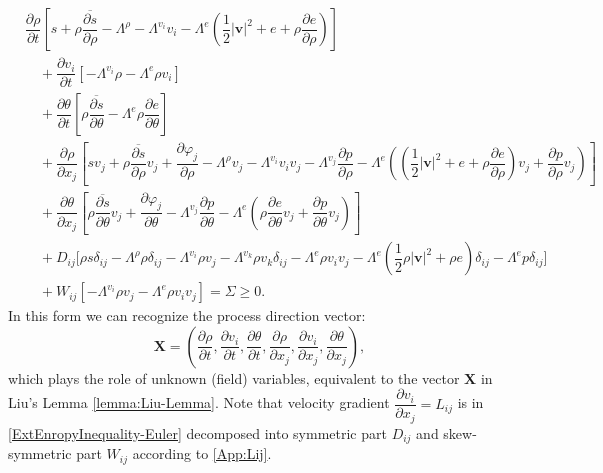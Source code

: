 \documentclass[a4paper,fleqn]{cas-sc}
\theoremstyle{definition}
\begin{document}
\begin{align} \label{ExtEnropyInequality-Euler}
	& \dfrac{\partial \rho}{\partial t} \left[ s + \rho \overline{\dfrac{\partial s}{\partial\rho}} - \Lambda^\rho - \Lambda^{v_i}v_i - \Lambda^ e \left(\dfrac{1}{2}|\mathbf{v}|^2 + e + \rho\dfrac{\partial e}{\partial\rho}\right) \right] 
	\nonumber \\
	& \quad + \dfrac{\partial v_i}{\partial t} \left[- \Lambda^{v_i}\rho - \Lambda^ e \rho v_i \right]
	\nonumber \\ 
	& \quad + \dfrac{\partial \theta}{\partial t} \left[ \rho \overline{\dfrac{\partial s}{\partial\theta}} - \Lambda^e \rho \dfrac{\partial e}{\partial\theta} \right] 
	\nonumber \\ 
	& \quad + \dfrac{\partial \rho}{\partial x_j} \left[ sv_j + \rho \overline{\dfrac{\partial s}{\partial\rho}} v_j + \dfrac{\partial\varphi_j}{\partial\rho} - \Lambda^\rho v_j - \Lambda^{v_i}v_i v_j - \Lambda^{v_j} \dfrac{\partial p}{\partial\rho} %
	- \Lambda^e \left(\left(\dfrac{1}{2}|\mathbf{v}|^2 + e + \rho\dfrac{\partial e}{\partial\rho} \right) v_j + \dfrac{\partial p}{\partial\rho} v_j \right) \right]
	\\ 
	& \quad + \dfrac{\partial \theta}{\partial x_j} \left[ \rho \overline{\dfrac{\partial s}{\partial\theta}} v_j + \dfrac{\partial\varphi_j}{\partial\theta} - \Lambda^{v_j}\dfrac{\partial p}{\partial\theta} - \Lambda^e \left(\rho\dfrac{\partial e}{\partial\theta}v_j + \dfrac{\partial p}{\partial\theta} v_j \right) \right] 
	\nonumber \\ 
	& \quad + D_{ij} \Big[ \rho s\delta_{ij} - \Lambda^\rho \rho \delta_{ij} - \Lambda^{v_i} \rho v_j - \Lambda^{v_k} \rho v_k \delta_{ij} %
	- \Lambda^e \rho v_i v_j - \Lambda^e \left( \dfrac{1}{2} \rho|\mathbf{v}|^2 + \rho e \right) \delta_{ij} - \Lambda^e p \delta_{ij} \Big] 
	\nonumber \\ 
	& \quad + W_{ij} \left[ -\Lambda^{v_i}\rho v_j-\Lambda^{e}\rho v_i v_j \right] = \Sigma \geq 0. 
	\nonumber
\end{align}
In this form we can recognize the process direction vector: 
\begin{equation} \label{ProcessDirectionVector-Euler}
	\mathbf{X} = \left( \dfrac{\partial \rho}{\partial t}, \dfrac{\partial v_i}{\partial t}, 
	\dfrac{\partial \theta}{\partial t}, \dfrac{\partial \rho}{\partial x_j}, 
	\dfrac{\partial v_i}{\partial x_j}, \dfrac{\partial \theta}{\partial x_j} \right), 
\end{equation}
which plays the role of unknown (field) variables, equivalent to the vector $\mathbf{X}$ in Liu's Lemma \ref{lemma:Liu-Lemma}. Note that velocity gradient $\dfrac{\partial v_{i}}{\partial x_{j}} = L_{ij}$ is in \eqref{ExtEnropyInequality-Euler} decomposed into symmetric part $D_{ij}$ and skew-symmetric part $W_{ij}$ according to \eqref{App:Lij}. 
\end{document}
